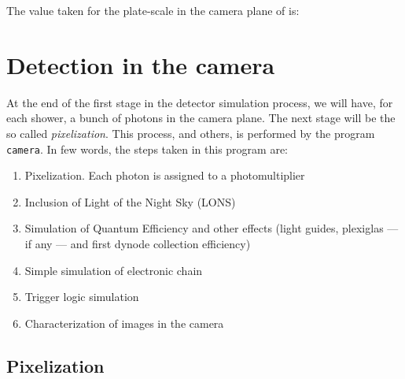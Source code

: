 The value taken for the plate-scale in the camera plane of \MAGIC is:
%
\platescaleeq

\zonefocalstbl

\section{Detection in the camera}

At the end of the first stage in the detector simulation process, we
will have, for each shower, a bunch of photons in the camera plane.
The next stage will be the so called \emph{pixelization}.  This
process, and others, is performed by the program \texttt{camera}. In
few words, the steps taken in this program are:

\begin{enumerate}
\item Pixelization. Each photon is assigned to a photomultiplier

\item Inclusion of Light of the Night Sky (LONS)
  
\item Simulation of Quantum Efficiency and other effects (light
  guides, plexiglas --- if any --- and first dynode collection
  efficiency)

\item Simple simulation of electronic chain

\item Trigger logic simulation

\item Characterization of images in the camera
\end{enumerate}

\zonesfig

\zonesfocalsfig

\subsection{Pixelization}

